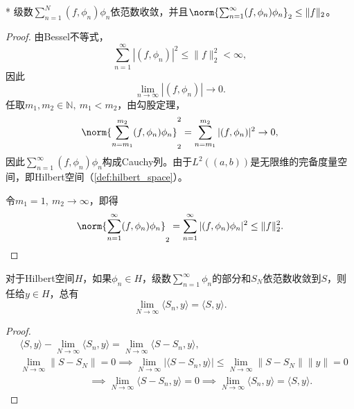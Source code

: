 \begin{lemma}*
    级数$\sum_{n=1}^{N}(f,\phi_n)\phi_n$依范数收敛，并且$\norm{\sum_{n=1}^{\infty}(f,\phi_n)\phi_n}_2\leq\|f\|_2$。
\end{lemma}
\begin{proof}
    由Bessel不等式，
    \begin{equation}
        \sum_{n=1}^{\infty}|(f,\phi_n)|^2\leq\|f\|_2^2<\infty,
    \end{equation}
    因此
    \begin{equation}
        \lim_{n\to\infty}|(f,\phi_n)|\to 0.
    \end{equation}
    任取$m_1,m_2\in\mathbb{N},\ m_1<m_2$，由勾股定理，
    \begin{equation}
        \norm{\sum_{n=m_1}^{m_2}(f,\phi_n)\phi_n}_2^2=\sum_{n=m_1}^{m_2}|(f,\phi_n)|^2\to 0,
    \end{equation}
    因此$\sum_{n=1}^{\infty}(f,\phi_n)\phi_n$构成Cauchy列。由于$L^2((a,b))$是无限维的完备度量空间，即Hilbert空间（\cref{def:hilbert_space}）。

    令$m_1=1,\ m_2\to\infty$，即得
    \begin{equation}
        \norm{\sum_{n=1}^{\infty}(f,\phi_n)\phi_n}_2 =\sum_{n=1}^{\infty}|(f,\phi_n)\phi_n|^2\leq\|f\|_2^2.
    \end{equation}
\end{proof}

\begin{proposition}[*Hilbert空间中的内积的连续性]\label{prop:hilbert_inner_product_continuous}
    对于Hilbert空间$H$，如果$\phi_n\in H$，级数$\sum_{n=1}^{\infty}\phi_n$的部分和$S_N$依范数收敛到$S$，则任给$y\in H$，总有
    \begin{equation}
        \lim_{N\to\infty}\langle S_n,y\rangle=\langle S,y\rangle.
    \end{equation}
\end{proposition}
\begin{proof}
    \begin{align}
        &\langle S,y\rangle-\lim_{N\to\infty}\langle S_n,y\rangle=\lim_{N\to\infty}\langle S-S_n,y\rangle, \\
        &\lim_{N\to\infty}\|S-S_N\|=0\implies \lim_{N\to\infty}|\langle S-S_n,y\rangle|\leq\lim_{N\to\infty}\|S-S_N\|\|y\|=0\nonumber\\
        &\hspace{3cm}\implies \lim_{N\to\infty}\langle S-S_n,y\rangle=0\implies\lim_{N\to\infty}\langle S_n,y\rangle=\langle S,y\rangle.
    \end{align}
\end{proof}

